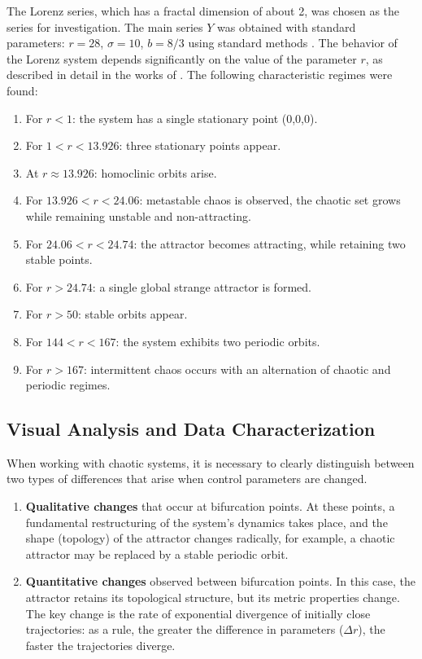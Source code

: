 \documentclass[a4paper,12pt]{extarticle}
\begin{document}
The Lorenz series, which has a fractal dimension of about 2, was chosen as the series for investigation.
 The main series \(Y\) was obtained with standard
  parameters: \(r = 28\), \(\sigma = 10\), \(b = 8/3\) using standard methods \cite{Balashova1991}.
   The behavior of the Lorenz system
   depends significantly on the value of the parameter \(r\), as described in detail in the
   works of \cite{KaplanYorke1979, Hateley2016}. The following characteristic regimes were found:
\begin{enumerate}
    \item For \(r < 1\): the system has a single stationary point (0,0,0).
    \item For \(1 < r < 13.926\): three stationary points appear.
    \item At \(r \approx 13.926\): homoclinic orbits arise.
    \item For \(13.926 < r < 24.06\): metastable chaos is observed, the chaotic
     set grows while remaining unstable and non-attracting.
    \item For \(24.06 < r < 24.74\): the attractor becomes attracting, while retaining two stable points.
    \item For \(r > 24.74\): a single global strange attractor is formed.
    \item For \(r > 50\): stable orbits appear.
    \item For \(144 < r < 167\): the system exhibits two periodic orbits.
    \item For \(r > 167\): intermittent chaos occurs with an alternation of chaotic and periodic regimes.
\end{enumerate}

\subsection{Visual Analysis and Data Characterization}

When working with chaotic systems, it is necessary to clearly distinguish between two
types of differences that arise when control parameters are changed.

\begin{enumerate}
    \item \textbf{Qualitative changes} that occur at bifurcation points.
     At these points, a fundamental restructuring of the system's dynamics takes place, and the shape (topology) of the attractor changes radically, for example, a chaotic attractor may be replaced by a stable periodic orbit.
    \item \textbf{Quantitative changes} observed between bifurcation
     points. In this case, the attractor retains its topological structure, but its metric properties change. The key change is the rate of exponential divergence of initially close trajectories: as a rule, the greater the difference in parameters (\(\Delta r\)), the faster the trajectories diverge.
\end{enumerate}
\end{document}
